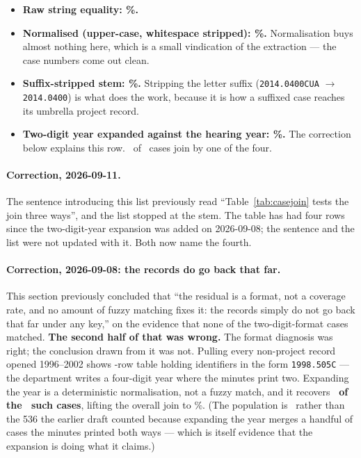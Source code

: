 \documentclass[11pt]{article}
\begin{document}
\begin{itemize}
\item \textbf{Raw string equality: \acqCaseRaw\%.}
\item \textbf{Normalised (upper-case, whitespace stripped): \acqCaseNorm\%.} Normalisation
buys almost nothing here, which is a small vindication of the extraction --- the case numbers
come out clean.
\item \textbf{Suffix-stripped stem: \acqCaseStem\%.} Stripping the letter suffix
(\texttt{2014.0400CUA} $\to$ \texttt{2014.0400}) is what does the work, because it is how a
suffixed case reaches its umbrella project record.
\item \textbf{Two-digit year expanded against the hearing year: \acqCaseExp\%.} The
correction below explains this row. \acqCaseAnyN\ of \acqCases\ cases join by one of the four.
\end{itemize}

\paragraph{Correction, 2026-09-11.} The sentence introducing this list previously read
``Table~\ref{tab:casejoin} tests the join three ways'', and the list stopped at the stem. The
table has had four rows since the two-digit-year expansion was added on 2026-09-08; the
sentence and the list were not updated with it. Both now name the fourth.

\paragraph{Correction, 2026-09-08: the records do go back that far.} This section previously
concluded that ``the residual is a format, not a coverage rate, and no amount of fuzzy matching
fixes it: the records simply do not go back that far under any key,'' on the evidence that
none of the two-digit-format cases matched. \textbf{The second half of that was
wrong.} The format diagnosis was right; the conclusion drawn from it was not. Pulling every
non-project record opened 1996--2002 shows \acqNonProjRows-row table holding identifiers in the
form \texttt{1998.505C} --- the department writes a four-digit year where the minutes print
two. Expanding the year is a deterministic normalisation, not a fuzzy match, and it recovers
\textbf{\acqOldFormatMatched\ of the \acqOldFormatCases\ such cases}, lifting the overall join
to \acqCaseAny\%. (The population is \acqOldFormatCases\ rather than the 536 the earlier draft
counted because expanding the year merges a handful of cases the minutes printed both ways ---
which is itself evidence that the expansion is doing what it claims.)
\end{document}
